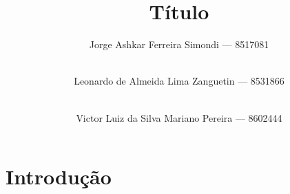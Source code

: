 \documentclass[12pt]{article}
\title{Título}
\author{
    Jorge Ashkar Ferreira Simondi\inst{1} --- 8517081\and\\
    Leonardo de Almeida Lima Zanguetin\inst{1} --- 8531866\and\\
    Victor Luiz da Silva Mariano Pereira\inst{1} --- 8602444\\
}
\begin{document}
\maketitle

\begin{resumo}

\end{resumo}


\section{Introdução}

\nocite{iaml:11}



\end{document}
